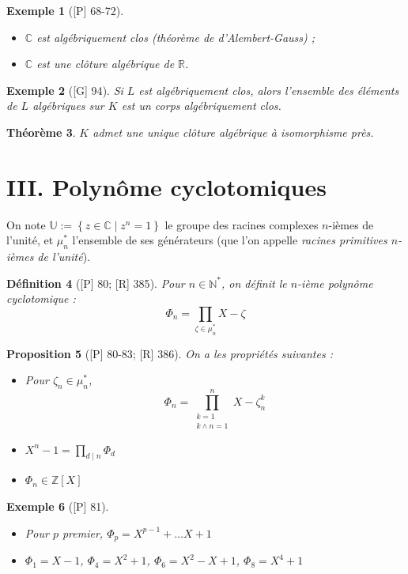 \documentclass[10pt, a4paper, parskip=full, twoside, twocolumn]{report}
\newtheorem{definition}{Définition}
\newtheorem{theorem}[definition]{Théorème}
\newtheorem{proposition}[definition]{Proposition}
\newtheorem{example}[definition]{Exemple}
\newcommand{\IN}{\mathbb{N}}
\newcommand{\IZ}{\mathbb{Z}}
\newcommand{\IU}{\mathbb{U}}
\newcommand{\IC}{\mathbb{C}}
\newcommand{\IR}{\mathbb{R}}
\begin{document}
\begin{example}[\textnormal{[P] 68-72}]
	\begin{itemize}
		\item $\IC$ est algébriquement clos (théorème de d'Alembert-Gauss) ;
		\item $\IC$ est une clôture algébrique de $\IR$.
	\end{itemize}
\end{example}

\begin{example}[\textnormal{[G] 94}]
	Si $L$ est algébriquement clos, alors l'ensemble des éléments de $L$ algébriques sur $K$ est un corps algébriquement clos.
\end{example}

\begin{theorem}
	$K$ admet une unique clôture algébrique à isomorphisme près.
\end{theorem}

\section*{III. Polynôme cyclotomiques}
\textcolor{paragraphtext}{On note $\IU := \left\{z\in \IC\mid z^n = 1\right\}$ le groupe des racines complexes $n$-ièmes de l'unité,
et $\mu_n^*$ l'ensemble de ses générateurs (que l'on appelle \emph{racines primitives $n$-ièmes de l'unité}).}

\begin{definition}[\textnormal{[P] 80; [R] 385}]
	Pour $n\in\IN^*$, on définit le \emph{$n$-ième polynôme cyclotomique} :
	$$\Phi_n = \prod_{\zeta\in \mu_n^*} X-\zeta$$
\end{definition}

\begin{proposition}[\textnormal{[P] 80-83; [R] 386}]
	On a les propriétés suivantes :
	\begin{itemize}
		\item Pour $\zeta_n\in\mu_n^*$, $$\Phi_n = \prod_{\substack{k=1 \\ k\wedge n = 1}}^{n} X - \zeta_n^k$$
		\item $X^n - 1 = \prod_{d\mid n} \Phi_d$
		\item $\Phi_n\in\IZ[X]$
	\end{itemize}
\end{proposition}

\begin{example}[\textnormal{[P] 81}]
		\begin{itemize}
			\item Pour $p$ premier, $\Phi_p = X^{p-1}+\dots X + 1$
			\item $\Phi_1 = X - 1$, $\Phi_4 = X^2 + 1$, $\Phi_6 =X^2 - X + 1$, $\Phi_8 = X^4 + 1$
		\end{itemize}
\end{example}
\end{document}
